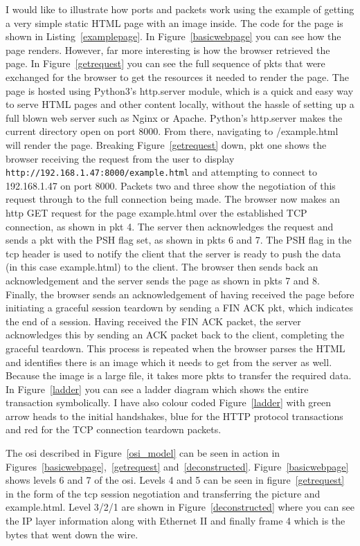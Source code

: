 \documentclass[titlepage]{article}
\begin{document}
I would like to illustrate how ports and packets work using the example of getting a very simple
static HTML page with an image inside.
The code for the page is shown in Listing~\ref{examplepage}.
In Figure~\ref{basicwebpage} you can see how the page renders.
However, far more interesting is how the browser retrieved the page. In Figure~\ref{getrequest}
you can see the full sequence of \glspl{pkt} that were exchanged for the 
browser to get the resources it needed to render the page. The page is hosted using Python3's 
http.server module, which is a quick and easy way to serve HTML pages and other content locally,
without the hassle of setting up a full blown web server such as Nginx or Apache.
Python's http.server makes the current directory open on port 8000.
From there, navigating to /example.html will render the page.
Breaking Figure~\ref{getrequest} down, \gls{pkt} one shows the browser receiving the request from the user to 
display \verb|http://192.168.1.47:8000/example.html| and attempting to connect to 192.168.1.47 on 
port 8000. Packets two and three show the negotiation of this request through to the full connection 
being made. The browser now makes an \gls{http} GET request for the page example.html over the 
established TCP connection, as shown in \gls{pkt} 4. The server then acknowledges the request and 
sends a \gls{pkt} with the PSH flag set, as shown in \glspl{pkt} 6 and 7.
The PSH flag in the \gls{tcp} header is used to notify the client that the server is ready to
push the data (in this case example.html) to the client.
The browser then sends back an acknowledgement and the server sends the page as shown in \glspl{pkt} 7 and 8. 
Finally, the browser sends an acknowledgement of having received the page before initiating a 
graceful session teardown by sending a FIN ACK \gls{pkt}, which indicates the end of a session.
Having received the FIN ACK packet, the server acknowledges this by sending an ACK packet back
to the client, completing the graceful teardown.
This process is repeated when the browser parses the HTML and identifies there is an image which it needs to 
get from the server as well. Because the image is a large file, it takes more \glspl{pkt} to
transfer the required data.
In Figure~\ref{ladder} you can see a ladder diagram which shows the entire transaction symbolically.
I have also colour coded Figure~\ref{ladder} with green arrow heads to the initial handshakes,
blue for the HTTP protocol transactions and red for the TCP connection teardown packets.

The \gls{osi} described in Figure~\ref{osi_model} can be seen in action in Figures~\ref{basicwebpage},~\ref{getrequest} and~\ref{deconstructed}.
Figure~\ref{basicwebpage} shows levels 6 and 7 of the \gls{osi}.
Levels 4 and 5 can be seen in figure~\ref{getrequest} in the form of the \gls{tcp}
session negotiation and transferring the picture and example.html.
Level 3/2/1 are shown in Figure~\ref{deconstructed} where you can see the IP layer information
along with Ethernet II and finally frame 4 which is the bytes that went down the wire.
\end{document}
